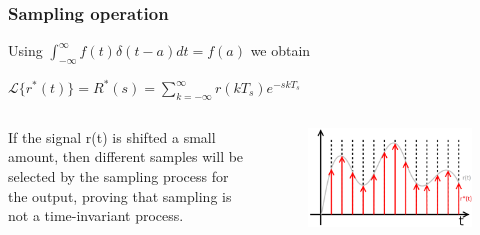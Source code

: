 \begin{frame}
	\frametitle{Sampling operation}
	\begin{block}{}
	Using $\int_{-\infty}^{\infty} f(t)\delta(t-a)dt = f(a)$ we obtain \\ 
	\begin{center}
		$\mathcal{L}\{r^*(t)\} = R^*(s) = \sum_{k=-\infty}^{\infty} r(kT_s)e^{-skT_s}$
	\end{center}
	\end{block}
	\vspace{1em}
	\begin{columns}
		\begin{column}{0.5\textwidth}
			If the signal r(t) is shifted a small amount, then different samples will be selected by the sampling process for the output, proving that sampling is not a time-invariant process.
		\end{column}
		\begin{column}{0.5\textwidth}
			\begin{figure}
				\includegraphics[width=0.9\linewidth]{sampled_signal}
			\end{figure}	
		\end{column}	
	\end{columns}
\end{frame}

